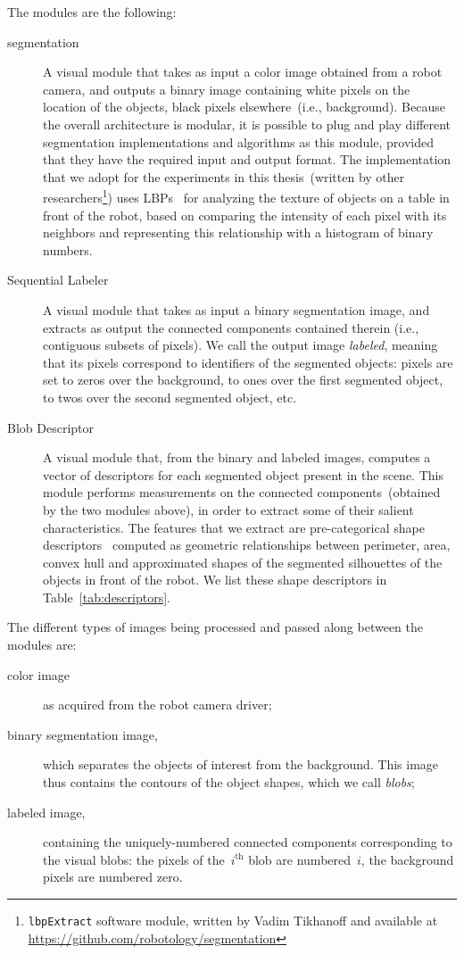 The modules are the following:
\begin{description}
    \item[segmentation] A visual module that takes as input a color image obtained from a robot camera, and outputs a binary image containing white pixels on the location of the objects, black pixels elsewhere~(i.e., background).
    Because the overall architecture is modular, it is possible to plug and play different segmentation implementations and algorithms as this module, provided that they have the required input and output format.
    The implementation that we adopt for the experiments in this thesis~(written by other researchers\footnote{%
        \texttt{lbpExtract} software module, written by Vadim Tikhanoff and available at \url{https://github.com/robotology/segmentation}
    }) %
    uses \acp{LBP}~\cite{ojala:2002:pami} for analyzing the texture of objects on a table in front of the robot, based on comparing the intensity of each pixel with its neighbors and representing this relationship with a histogram of binary numbers. \label{para:lbpExtract}

    \item[Sequential Labeler] A visual module that takes as input a binary segmentation image, and extracts as output the connected components contained therein (i.e., contiguous subsets of pixels). We call the output image \emph{labeled}, meaning that its pixels correspond to identifiers of the segmented objects: pixels are set to zeros over the background, to ones over the first segmented object, to twos over the second segmented object, etc.

    \item[Blob Descriptor] A visual module that, from the binary and labeled images, computes a vector of descriptors for each segmented object present in the scene.
    This module performs measurements on the connected components~(obtained by the two modules above), in order to extract some of their salient characteristics.
    The features that we extract are pre-categorical shape descriptors~\cite{zhang:2004:shape} computed as geometric relationships between perimeter, area, convex hull and approximated shapes of the segmented silhouettes of the objects in front of the robot.
    We list these shape descriptors in Table~\ref{tab:descriptors}.
\end{description}

The different types of images being processed and passed along between the modules are:
\begin{description}
    \item[color image] as acquired from the robot camera driver;

    \item[binary segmentation image,] which separates the objects of interest from the background. This image thus contains the contours of the object shapes, which we call \emph{blobs};

    \item[labeled image,] containing the uniquely-numbered connected components corresponding to the visual blobs: the pixels of the~$i^{\text{th}}$ blob are numbered~$i$, the background pixels are numbered zero.
\end{description}

